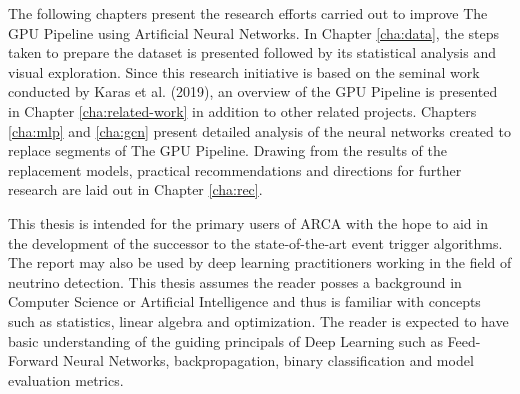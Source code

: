 The following chapters present the research efforts carried out to
improve The GPU Pipeline using Artificial Neural Networks. In Chapter
\ref{cha:data}, the steps taken to prepare the dataset is presented
followed by its statistical analysis and visual exploration. Since
this research initiative is based on the seminal work conducted by
Karas et al. (2019), an overview of the GPU Pipeline is presented in
Chapter \ref{cha:related-work} in addition to other related projects.
Chapters \ref{cha:mlp} and \ref{cha:gcn} present detailed analysis of
the neural networks created to replace segments of The GPU Pipeline.
Drawing from the results of the replacement models, practical
recommendations and directions for further research are laid out in
Chapter \ref{cha:rec}.

This thesis is intended for the primary users of ARCA with the hope to
aid in the development of the successor to the state-of-the-art event
trigger algorithms. The report may also be used by deep learning
practitioners working in the field of neutrino detection. This thesis
assumes the reader posses a background in Computer Science or
Artificial Intelligence and thus is familiar with concepts such as
statistics, linear algebra and optimization. The reader is expected to
have basic understanding of the guiding principals of Deep Learning
such as Feed-Forward Neural Networks, backpropagation, binary
classification and model evaluation metrics.

